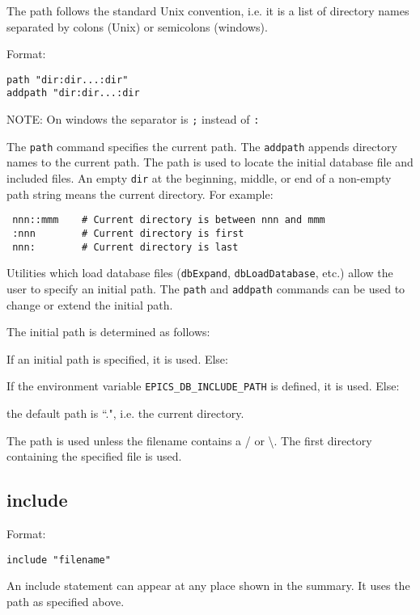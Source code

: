 The path follows the standard Unix convention, i.e. it is a list of directory names separated by colons (Unix) or 
semicolons (windows).

Format:

\begin{verbatim}path "dir:dir...:dir"
addpath "dir:dir...:dir
\end{verbatim}NOTE: On windows the separator is \verb|;| instead of \verb|:|

The \verb|path| command specifies the current path. The \verb|addpath| appends directory names to the current path. The path is 
used to locate the initial database file and included files. An empty \verb|dir| at the beginning, middle, or end of a non-empty 
path string means the current directory. For example:

\begin{verbatim} nnn::mmm    # Current directory is between nnn and mmm
 :nnn        # Current directory is first
 nnn:        # Current directory is last
\end{verbatim}Utilities which load database files (\verb|dbExpand|, \verb|dbLoadDatabase|, etc.) allow the user to specify an initial path. The 
\verb|path| and \verb|addpath| commands can be used to change or extend the initial path.

The initial path is determined as follows:

\begin{description}\item If an initial path is specified, it is used. Else:

\item If the environment variable \verb|EPICS_DB_INCLUDE_PATH| is defined, it is used. Else:

\item the default path is ``.", i.e. the current directory.

\end{description}The path is used unless the filename contains a / or \textbackslash{}. The first directory containing the specified file is used.

\subsection{include}

Format:

\begin{verbatim}include "filename"
\end{verbatim}An include statement can appear at any place shown in the summary. It uses the path as specified above.

